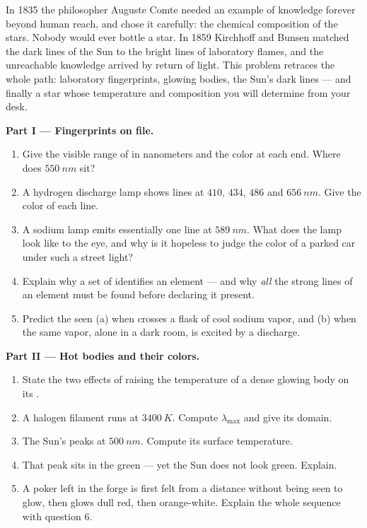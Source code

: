 \begin{problem}
\label{pb:g10:light-spectra:1}
In 1835 the philosopher Auguste Comte needed an example of knowledge
forever beyond human reach, and chose it carefully: the chemical
composition of the stars. Nobody would ever bottle a star. In 1859
Kirchhoff and Bunsen matched the dark lines of the Sun to the bright
lines of laboratory flames, and the unreachable knowledge arrived by
return of light. This problem retraces the whole path: laboratory
fingerprints, glowing bodies, the Sun's dark lines --- and finally a
star whose temperature and composition you will determine from your
desk.

\medskip
\noindent\textbf{Part I --- Fingerprints on file.}
\begin{enumerate}
  \item Give the visible range of  in nanometers and the
        color at each end. Where does $\qty{550}{nm}$ sit?
  \item A hydrogen discharge lamp shows lines at $410$, $434$, $486$
        and $\qty{656}{nm}$. Give the color of each line.
  \item A sodium lamp emits essentially one line at $\qty{589}{nm}$.
        What does the lamp look like to the eye, and why is it hopeless
        to judge the color of a parked car under such a street light?
  \item Explain why a set of  identifies an element ---
        and why \emph{all} the strong lines of an element must be found
        before declaring it present.
  \item Predict the  seen (a) when  crosses a flask
        of cool sodium vapor, and (b) when the same vapor, alone in a
        dark room, is excited by a discharge.
\end{enumerate}

\medskip
\noindent\textbf{Part II --- Hot bodies and their colors.}
\begin{enumerate}[resume]
  \item State the two effects of raising the temperature of a dense
        glowing body on its .
  \item A halogen filament runs at $\qty{3400}{K}$. Compute
        $\lambda_{\max}$ and give its domain.
  \item The Sun's  peaks at $\qty{500}{nm}$. Compute
        its surface temperature.
  \item That peak sits in the green --- yet the Sun does not look
        green. Explain.
  \item A poker left in the forge is first felt from a distance without
        being seen to glow, then glows dull red, then orange-white.
        Explain the whole sequence with question 6.
\end{enumerate}


\end{problem}
